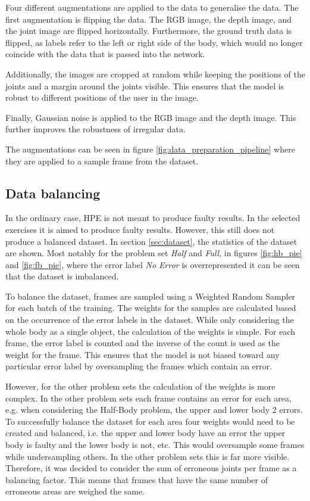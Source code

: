 Four different augmentations are applied to the data to generalise the data. The first augmentation is flipping the data. The RGB image, the depth image, and the joint image are flipped horizontally. Furthermore, the ground truth data is flipped, as labels refer to the left or right side of the body, which would no longer coincide with the data that is passed into the network.

Additionally, the images are cropped at random while keeping the positions of the joints and a margin around the joints visible. This ensures that the model is robust to different positions of the user in the image. 

Finally, Gaussian noise is applied to the RGB image and the depth image. This further improves the robustness of irregular data.

The augmentations can be seen in figure \ref{fig:data_preparation_pipeline} where they are applied to a sample frame from the dataset.

\subsection{Data balancing}

In the ordinary case, HPE is not meant to produce faulty results. In the selected exercises it is aimed to produce faulty results. However, this still does not produce a balanced dataset. In section \ref{sec:dataset}, the statistics of the dataset are shown. Most notably for the problem set \textit{Half} and \textit{Full}, in figures \ref{fig:hb_pie} and \ref{fig:fb_pie}, where the error label \textit{No Error} is overrepresented it can be seen that the dataset is imbalanced.

To balance the dataset, frames are sampled using a Weighted Random Sampler for each batch of the training. The weights for the samples are calculated based on the occurrence of the error labels in the dataset. While only considering the whole body as a single object, the calculation of the weights is simple. For each frame, the error label is counted and the inverse of the count is used as the weight for the frame. This ensures that the model is not biased toward any particular error label by oversampling the frames which contain an error.

However, for the other problem sets the calculation of the weights is more complex. In the other problem sets each frame contains an error for each area, e.g. when considering the Half-Body problem, the upper and lower body 2 errors. To successfully balance the dataset for each area four weights would need to be created and balanced, i.e. the upper and lower body have an error the upper body is faulty and the lower body is not, etc. This would oversample some frames while undersampling others. In the other problem sets this is far more visible. Therefore, it was decided to consider the sum of erroneous joints per frame as a balancing factor. This means that frames that have the same number of erroneous areas are weighed the same.
